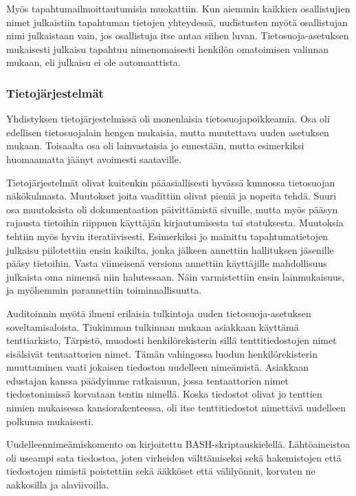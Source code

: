 \documentclass[finnish]{tktltiki}
\begin{document}
Myös tapahtumailmoittautumisia muokattiin. Kun aiemmin kaikkien osallistujien nimet julkaistiin tapahtuman tietojen yhteydessä, uudistusten myötä osallistujan nimi julkaistaan vain, jos osallistuja itse antaa siihen luvan. Tietosuoja-asetuksen mukaisesti julkaisu tapahtuu nimenomaisesti henkilön omatoimisen valinnan mukaan, eli julkaisu ei ole automaattista.

\subsubsection{Tietojärjestelmät}

Yhdistyksen tietojärjestelmissä oli monenlaisia tietosuojapoikkeamia. Osa oli edellisen tietosuojalain hengen mukaisia, mutta muutettava uuden asetuksen mukaan. Toisaalta osa oli lainvastaisia jo ennestään, mutta esimerkiksi huomaamatta jäänyt avoimesti saataville.

Tietojärjestelmät olivat kuitenkin pääasiallisesti hyvässä kunnossa tietosuojan näkökulmasta. Muutokset joita vaadittiin olivat pieniä ja nopeita tehdä. Suuri osa muutoksista oli dokumentaation päivittämistä sivuille, mutta myös pääsyn rajausta tietoihin riippuen käyttäjän kirjautumisesta tai statuksesta. Muutoksia tehtiin myös hyvin iteratiivisesti. Esimerkiksi jo mainittu tapahtumatietojen julkaisu piilotettiin ensin kaikilta, jonka jälkeen annettiin hallituksen jäsenille pääsy tietoihin. Vasta viimeisenä versiona annettiin käyttäjille mahdollisuus julkaista oma nimensä niin halutessaan. Näin varmistettiin ensin lainmukaisuus, ja myöhemmin parannettiin toiminnallisuutta.

Auditoinnin myötä ilmeni erilaisia tulkintoja uuden tietosuoja-asetuksen soveltamisaloista. Tiukimman tulkinnan mukaan asiakkaan käyttämä tenttiarkisto, Tärpistö, muodosti henkilörekisterin sillä tenttitiedostojen nimet sisälsivät tentaattorien nimet. Tämän vahingossa luodun henkilörekisterin muuttaminen vaati jokaisen tiedoston uudelleen nimeämistä. Asiakkaan edustajan kanssa päädyimme ratkaisuun, jossa tentaattorien nimet tiedostonimissä korvataan tentin nimellä. Koska tiedostot olivat jo tenttien nimien mukaisessa kansiorakenteessa, oli itse tenttitiedostot nimettävä uudelleen polkunsa mukaisesti.

Uudelleennimeämiskomento on kirjoitettu BASH-skriptauskielellä. Lähtöaineistoa oli useampi sata tiedostoa, joten virheiden välttämiseksi sekä hakemistojen että tiedostojen nimistä poistettiin sekä ääkköset että välilyönnit, korvaten ne aakkosilla ja alaviivoilla.
\end{document}
